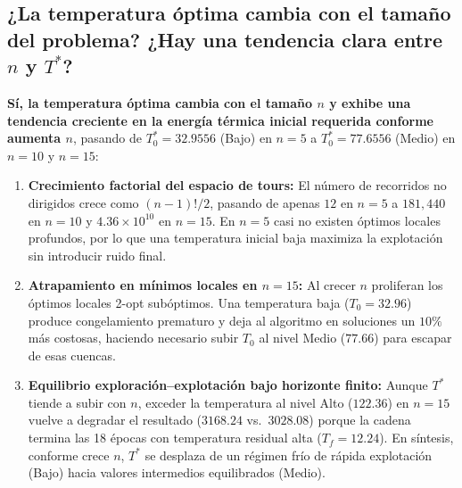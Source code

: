 \documentclass[11pt,letterpaper]{article}
\begin{document}
\subsection{\color{cafeuanl} ¿La temperatura óptima cambia con el tamaño del problema? ¿Hay una tendencia clara entre $n$ y $T^*$?}
\textbf{Sí, la temperatura óptima cambia con el tamaño $n$ y exhibe una tendencia creciente en la energía térmica inicial requerida conforme aumenta $n$}, pasando de $T_0^* = 32.9556$ (Bajo) en $n = 5$ a $T_0^* = 77.6556$ (Medio) en $n = 10$ y $n = 15$:
\begin{enumerate}
    \item \textbf{Crecimiento factorial del espacio de tours:} El número de recorridos no dirigidos crece como $(n-1)!/2$, pasando de apenas $12$ en $n = 5$ a $181{,}440$ en $n = 10$ y $4.36 \times 10^{10}$ en $n = 15$. En $n = 5$ casi no existen óptimos locales profundos, por lo que una temperatura inicial baja maximiza la explotación sin introducir ruido final.
    \item \textbf{Atrapamiento en mínimos locales en $n = 15$:} Al crecer $n$ proliferan los óptimos locales 2-opt subóptimos. Una temperatura baja ($T_0 = 32.96$) produce congelamiento prematuro y deja al algoritmo en soluciones un $10\%$ más costosas, haciendo necesario subir $T_0$ al nivel Medio ($77.66$) para escapar de esas cuencas.
    \item \textbf{Equilibrio exploración--explotación bajo horizonte finito:} Aunque $T^*$ tiende a subir con $n$, exceder la temperatura al nivel Alto ($122.36$) en $n = 15$ vuelve a degradar el resultado ($3168.24$ vs.\ $3028.08$) porque la cadena termina las 18 épocas con temperatura residual alta ($T_f = 12.24$). En síntesis, conforme crece $n$, $T^*$ se desplaza de un régimen frío de rápida explotación (Bajo) hacia valores intermedios equilibrados (Medio).
\end{enumerate}
\end{document}

